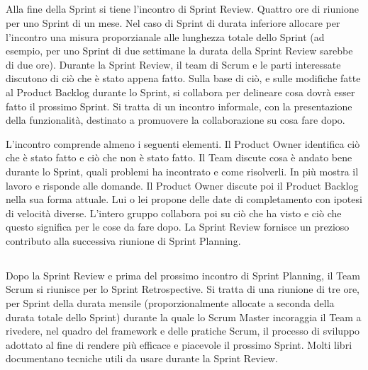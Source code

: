 
\subsection*{\color{Blue}{SPRINT REVIEW}}
\label{sec:sprintreview}
Alla fine della Sprint si tiene l'incontro di Sprint Review. Quattro ore di riunione per uno Sprint di un mese. Nel
caso di Sprint di durata inferiore allocare per l'incontro una misura proporzianale alle lunghezza totale dello Sprint
(ad esempio, per uno Sprint di due settimane la durata della Sprint Review sarebbe di due ore). Durante la Sprint Review, il
team di Scrum e le parti interessate discutono di ci\`o che \`e stato appena fatto. Sulla base di ci\`o, e sulle modifiche fatte al Product Backlog durante lo Sprint, si collabora per delineare cosa dovr\`a esser fatto il prossimo Sprint. Si
tratta di un incontro informale, con la presentazione della funzionalit\`a, destinato a promuovere la collaborazione su
cosa fare dopo. 
\newline

L'incontro comprende almeno i seguenti elementi. Il Product Owner identifica ci\`o che \`e stato fatto e ci\`o che non
\`e stato fatto. Il Team discute cosa \`e andato bene durante lo Sprint, quali problemi ha incontrato e come
risolverli. In pi\`u mostra il lavoro e risponde alle domande. Il Product Owner discute poi il Product
Backlog nella sua forma attuale. Lui o lei propone delle date di completamento con ipotesi di velocit\`a diverse.
L'intero gruppo collabora poi su ci\`o che ha visto e ci\`o che questo significa per le cose da fare dopo. La Sprint
Review fornisce un prezioso contributo alla successiva riunione di Sprint Planning.

\subsection*{\color{Blue}{SPRINT RETROSPECTIVE}}
\label{sec:sprintretrospective}
Dopo la Sprint Review e prima del prossimo incontro di Sprint Planning, il Team Scrum si riunisce per lo Sprint
Retrospective. Si tratta di una riunione di tre ore, per Sprint della durata mensile (proporzionalmente allocate a seconda della durata totale dello Sprint) durante la quale lo Scrum Master incoraggia il Team a rivedere, nel quadro del framework e
delle pratiche Scrum, il processo di sviluppo adottato al fine di rendere pi\`u efficace e piacevole il prossimo Sprint.
Molti libri documentano tecniche utili da usare durante la Sprint Review.
\newline

